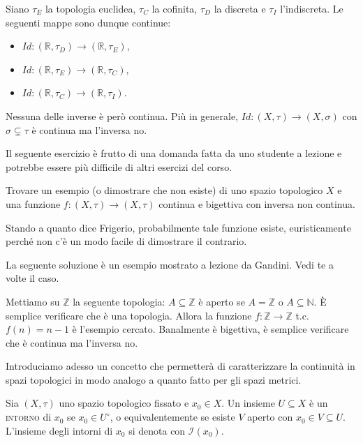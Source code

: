 \documentclass{article}
\begin{document}
\begin{ex}
	Siano $\tau_E$ la topologia euclidea, $\tau_C$ la cofinita, $\tau_D$ la
	discreta e $\tau_I$ l'indiscreta. Le seguenti mappe sono dunque continue:
    \begin{itemize}
	\item $Id:(\mathbb{R}, \tau_D) \rightarrow (\mathbb{R}, \tau_E)$,
    \item $Id:(\mathbb{R}, \tau_E) \rightarrow (\mathbb{R}, \tau_C)$,
    \item $Id:(\mathbb{R}, \tau_C) \rightarrow (\mathbb{R}, \tau_I)$.
    \end{itemize}
    Nessuna delle inverse è però continua. Più in generale, $Id: (X, \tau)
    \rightarrow (X, \sigma)$ con $\sigma \subsetneq \tau$ è continua ma
    l'inversa no.
\end{ex}

\begin{exc}
	Il seguente esercizio è frutto di una domanda fatta da uno studente a
	lezione e potrebbe essere più difficile di altri esercizi del corso.

    \marginpar{\warningsign}
	Trovare un esempio (o dimostrare che non esiste) di uno spazio topologico
	$X$ e una funzione $f: (X, \tau) \rightarrow (X, \tau)$ continua e bigettiva
	con inversa non continua.

    Stando a quanto dice Frigerio, probabilmente tale funzione esiste,
    euristicamente perché non c'è un modo facile di dimostrare il contrario.
\end{exc}

\begin{sol}
	La seguente soluzione è un esempio mostrato a lezione da Gandini. Vedi te a
	volte il caso.

	Mettiamo su $\mathbb{Z}$ la seguente topologia: $A \subseteq \mathbb{Z}$ è
	aperto se $A=\mathbb{Z}$ o $A \subseteq \mathbb{N}$. È semplice verificare
	che è una topologia. Allora la funzione $f: \mathbb{Z} \rightarrow
	\mathbb{Z}$ t.c. $f(n)=n-1$ è l'esempio cercato. Banalmente è bigettiva, è
	semplice verificare che è continua ma l'inversa no.
\end{sol}

Introduciamo adesso un concetto che permetterà di caratterizzare la continuità
in spazi topologici in modo analogo a quanto fatto per gli spazi metrici.

\begin{defn}
	Sia $(X, \tau)$ uno spazio topologico fissato e $x_0 \in X$. Un insieme $U
	\subseteq X$ è un \textsc{intorno} di $x_0$ se $x_0 \in
	U^{\circ}$, o equivalentemente se esiste $V$ aperto con $x_0 \in V
	\subseteq U$. L'insieme degli intorni di $x_0$ si denota con
	$\mathcal{I}(x_0)$.
\end{defn}
\end{document}

